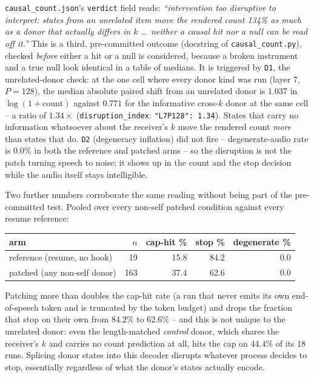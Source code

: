 \documentclass[11pt]{article}
\begin{document}
\texttt{causal\_count.json}'s \texttt{verdict} field reads: \emph{``intervention
too disruptive to interpret: states from an unrelated item move the rendered
count 134\% as much as a donor that actually differs in $k$ \ldots\ neither a
causal hit nor a null can be read off it.''} This is a third, pre-committed
outcome (docstring of \texttt{causal\_count.py}), checked \emph{before} either
a hit or a null is considered, because a broken instrument and a true null look
identical in a table of medians. It is triggered by \texttt{D1}, the
unrelated-donor check: at the one cell where every donor kind was run (layer 7,
$P{=}128$), the median absolute paired shift from an unrelated donor is
$1.037$ in $\log(1{+}\text{count})$ against $0.771$ for the informative
cross-$k$ donor at the same cell -- a ratio of $1.34\times$
(\texttt{disruption\_index}: \texttt{"L7\textbar P128": 1.34}). States that
carry no information whatsoever about the receiver's $k$ move the rendered
count \emph{more} than states that do. \texttt{D2} (degeneracy inflation) did
not fire -- degenerate-audio rate is $0.0\%$ in both the reference and patched
arms -- so the disruption is not the patch turning speech to noise; it shows up
in the count and the stop decision while the audio itself stays intelligible.

Two further numbers corroborate the same reading without being part of the
pre-committed test. Pooled over every non-self patched condition against every
resume reference:

\begin{center}
\begin{tabular}{lrrrr}
\toprule
arm & $n$ & cap-hit \% & stop \% & degenerate \% \\
\midrule
reference (resume, no hook) & 19  & 15.8 & 84.2 & 0.0 \\
patched (any non-self donor) & 163 & 37.4 & 62.6 & 0.0 \\
\bottomrule
\end{tabular}
\end{center}

\noindent Patching more than doubles the cap-hit rate (a run that never emits
its own end-of-speech token and is truncated by the token budget) and drops the
fraction that stop on their own from $84.2\%$ to $62.6\%$ -- and this is not
unique to the unrelated donor: even the length-matched \emph{control} donor,
which shares the receiver's $k$ and carries no count prediction at all, hits the
cap on $44.4\%$ of its 18 runs. Splicing donor states into this decoder disrupts
whatever process decides to stop, essentially regardless of what the donor's
states actually encode.
\end{document}

